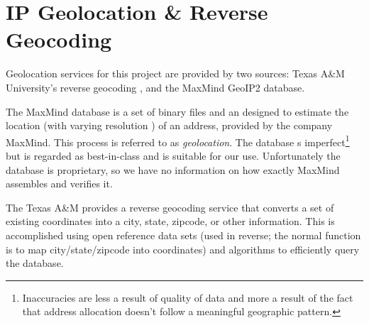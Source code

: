 \section{IP Geolocation \& Reverse Geocoding}\label{sec:background_geolocation}

Geolocation services for this project are provided by two sources: Texas A\&M University's reverse geocoding \api, and the MaxMind GeoIP2 database.

The MaxMind database is a set of binary files and an \sdk designed to estimate the location (with varying resolution \cite{MaxmindResolution2020}) of an \ip address, provided by the company MaxMind. This process is referred to as \textit{\ip geolocation}. The database s imperfect\footnote{Inaccuracies are less a result of quality of data and more a result of the fact that \ip address allocation doesn't follow a meaningful geographic pattern.} but is regarded as best-in-class and is suitable for our use. Unfortunately the database is proprietary, so we have no information on how exactly MaxMind assembles and verifies it.

The Texas A\&M \api provides a reverse geocoding service that converts a set of existing coordinates into a city, state, zipcode, or other information. This is accomplished using open reference data sets (used in reverse; the normal function is to map city/state/zipcode into coordinates) and algorithms to efficiently query the database.
